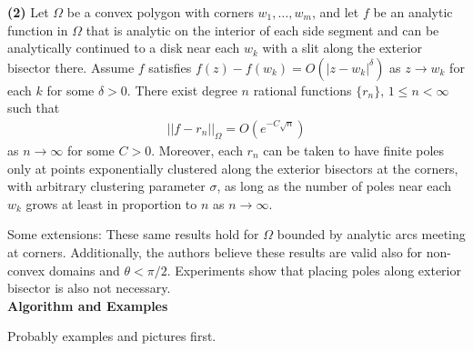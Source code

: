 \documentclass[12]{article}
\begin{document}
	\textbf{(2)} Let $\Omega$ be a convex polygon with corners $w_1 , \ldots , w_m$, and let $f$ be an analytic function in $\Omega$ that is analytic on the interior of each side segment and can be analytically continued to a disk near each $w_k$ with a slit along the exterior bisector there. Assume $f$ satisfies $f(z)-f(w_k)=O(|z-w_k|^\delta)$ as $z \to w_k$ for each $k$ for some $\delta >0$. There exist degree $n$ rational functions $\{r_n\},\, 1 \leq n < \infty$ such that
	\begin{align*}
	||f-r_n||_\Omega=O(e^{-C\sqrt{n}})
	\end{align*}
as $n\to \infty$ for some $C>0$. Moreover, each $r_n$ can be taken to have finite poles only at points exponentially clustered along the exterior bisectors at the corners, with arbitrary clustering parameter $\sigma$, as long as the number of poles near each $w_k$ grows at least in proportion to $n$ as $n\to \infty$.
	
	Some extensions: These same results hold for $\Omega$ bounded by analytic arcs meeting at corners. Additionally, the authors believe these results are valid also for non-convex domains and $\theta < \pi /2$. Experiments show that placing poles along exterior bisector is also not necessary.\\
	
\noindent
\textbf{Algorithm and Examples}

	Probably examples and pictures first.
\end{document}
